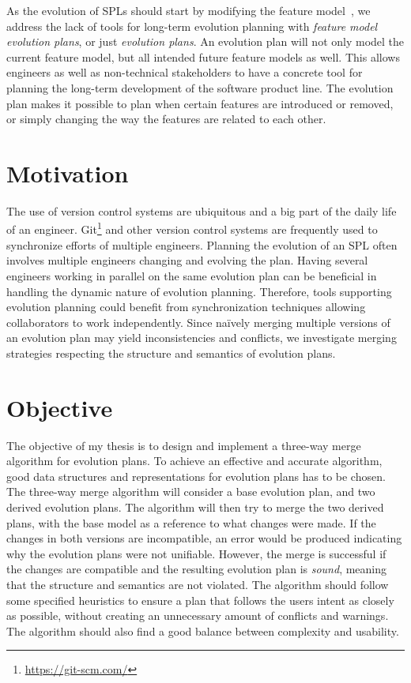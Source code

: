 \documentclass[a4paper,english]{ifimaster}
\begin{document}
As the evolution of SPLs should start by modifying the feature model~\cite{cite:alves_product_line_refactoring}, we address the lack of tools for long-term evolution planning with \textit{feature model evolution plans}, or just \textit{evolution plans}. An evolution plan will not only model the current feature model, but all intended future feature models as well. This allows engineers as well as non-technical stakeholders to have a concrete tool for planning the long-term development of the software product line. The evolution plan makes it possible to plan when certain features are introduced or removed, or simply changing the way the features are related to each other. 

\section{Motivation}%
\label{sec:motivation}

The use of version control systems are ubiquitous and a big part of the daily life of an engineer. Git\footnote{\url{https://git-scm.com/}} and other version control systems are frequently used to synchronize efforts of multiple engineers. Planning the evolution of an SPL often involves multiple engineers changing and evolving the plan. Having several engineers working in parallel on the same evolution plan can be beneficial in handling the dynamic nature of evolution planning. Therefore, tools supporting evolution planning could benefit from synchronization techniques allowing collaborators to work independently. Since naïvely merging multiple versions of an evolution plan may yield inconsistencies and conflicts, we investigate merging strategies respecting the structure and semantics of evolution plans.

\section{Objective}%
\label{sec:objective}

The objective of my thesis is to design and implement a three-way merge algorithm for evolution plans. To achieve an effective and accurate algorithm, good data structures and representations for evolution plans has to be chosen. The three-way merge algorithm will consider a base evolution plan, and two derived evolution plans. The algorithm will then try to merge the two derived plans, with the base model as a reference to what changes were made. If the changes in both versions are incompatible, an error would be produced indicating why the evolution plans were not unifiable. However, the merge is successful if the changes are compatible and the resulting evolution plan is \textit{sound}, meaning that the structure and semantics are not violated. The algorithm should follow some specified heuristics to ensure a plan that follows the users intent as closely as possible, without creating an unnecessary amount of conflicts and warnings. The algorithm should also find a good balance between complexity and usability.
\end{document}
